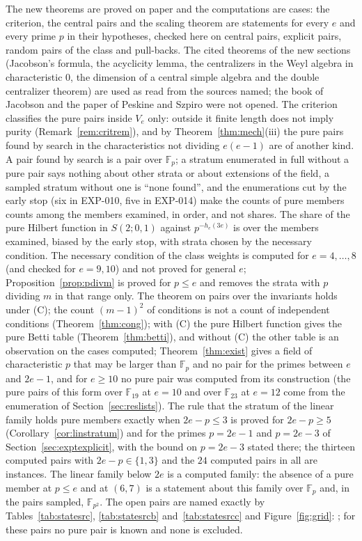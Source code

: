 \documentclass[11pt]{article}
\theoremstyle{definition}
\theoremstyle{remark}
\newcommand{\EXP}[1]{\mbox{EXP-#1}}
\newcommand{\F}{\mathbb{F}}
\begin{document}
The new theorems are proved on paper and the computations are cases: the criterion, the central pairs and the scaling theorem are statements for every $e$ and every prime $p$ in their hypotheses, checked here on \ncenCases{} central pairs, \ncritXCases{} explicit pairs, \ncritRandomPairs{} random pairs of the class and \npbCases{} pull-backs. The cited theorems of the new sections (Jacobson's formula, the acyclicity lemma, the centralizers in the Weyl algebra in characteristic $0$, the dimension of a central simple algebra and the double centralizer theorem) are used as read from the sources named; the book of Jacobson and the paper of Peskine and Szpiro were not opened. The criterion classifies the pure pairs inside $V_e$ only: outside it finite length does not imply purity (Remark~\ref{rem:critrem}), and by Theorem~\ref{thm:mech}(iii) the pure pairs found by search in the characteristics not dividing $e(e-1)$ are of another kind. A pair found by search is a pair over $\F_p$; a stratum enumerated in full without a pure pair says nothing about other strata or about extensions of the field, a sampled stratum without one is ``none found'', and the enumerations cut by the early stop (six in \EXP{010}, five in \EXP{014}) make the counts of pure members counts among the members examined, in order, and not shares. The share of the pure Hilbert function in $S(2;0,1)$ against $p^{-h_e(3e)}$ is over the members examined, biased by the early stop, with strata chosen by the necessary condition. The necessary condition of the class weights is computed for $e=4,\dots,8$ (and checked for $e=9,10$) and not proved for general $e$; Proposition~\ref{prop:pdivm} is proved for $p\le e$ and removes the strata with $p$ dividing $m$ in that range only. The theorem on pairs over the invariants holds under (C); the count $(m-1)^2$ of conditions is not a count of independent conditions (Theorem~\ref{thm:cong}); with (C) the pure Hilbert function gives the pure Betti table (Theorem~\ref{thm:betti}), and without (C) the other table is an observation on the cases computed; Theorem~\ref{thm:exist} gives a field of characteristic $p$ that may be larger than $\F_p$ and no pair for the primes between $e$ and $2e-1$, and for $e\ge10$ no pure pair was computed from its construction (the pure pairs of this form over $\F_{19}$ at $e=10$ and over $\F_{23}$ at $e=12$ come from the enumeration of Section~\ref{sec:reslists}). The rule that the stratum of the linear family holds pure members exactly when $2e-p\le3$ is proved for $2e-p\ge5$ (Corollary~\ref{cor:linstratum}) and for the primes $p=2e-1$ and $p=2e-3$ of Section~\ref{sec:exptexplicit}, with the bound on $p=2e-3$ stated there; the thirteen computed pairs with $2e-p\in\{1,3\}$ and the $24$ computed pairs in all are instances. The linear family below $2e$ is a computed family: the absence of a pure member at $p\le e$ and at $(6,7)$ is a statement about this family over $\F_p$ and, in the pairs sampled, $\F_{p^2}$. The open pairs are named exactly by Tables~\ref{tab:statesrc}, \ref{tab:statesrcb} and~\ref{tab:statesrcc} and Figure~\ref{fig:grid}: \ngridOpenList{}; for these pairs no pure pair is known and none is excluded.
\end{document}
